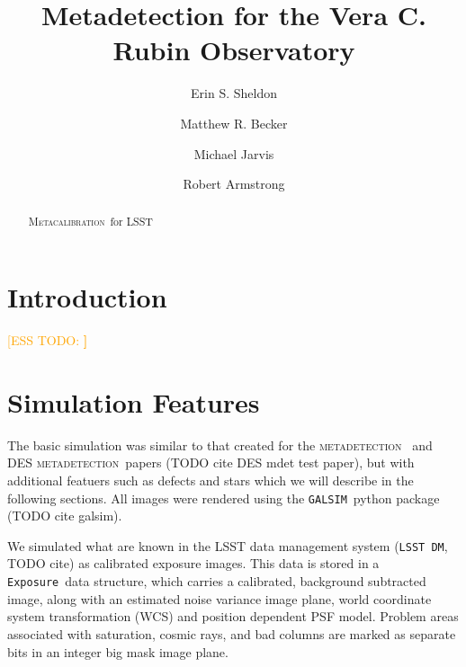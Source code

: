\documentclass[iop, twocolappendix, appendixfloats, numberedappendix, apj]{hackemulateapj}
\newcommand{\esstodo}[1]{\textcolor{orange}{[ESS TODO: \bf #1]}}
\newcommand{\galsim}{\texttt{GALSIM}}
\newcommand{\calexp}{\texttt{Exposure}}
\newcommand{\dm}{\texttt{LSST DM}}
\newcommand{\mdet}{\textsc{metadetection}}
\newcommand{\Mcal}{\textsc{Metacalibration}}
\newcommand{\Mdet}{\textsc{Metadetection}}
\begin{document}



\title{Metadetection for the Vera C. Rubin Observatory}

\author{Erin S. Sheldon}
\author{Matthew R. Becker}
\author{Michael Jarvis}
\author{Robert Armstrong}


\begin{abstract}

    \Mcal\ for LSST

\end{abstract}


\section{Introduction} \label{sec:intro}

\esstodo{}

\section{Simulation Features} \label{sec:sim}

The basic simulation was similar to that created for the \mdet\ \citep{mdet20}
and DES \mdet\ papers (TODO cite DES mdet test paper), but with additional
featuers such as defects and stars which we will describe in the following
sections.  All images were rendered using the \galsim\ python package (TODO
cite galsim).

We simulated what are known in the LSST data management system (\dm, TODO cite)
as calibrated exposure images.  This data is stored in a \calexp\ data
structure, which carries a calibrated, background subtracted image, along with
an estimated noise variance image plane, world coordinate system transformation
(WCS) and position dependent PSF model.  Problem areas associated with
saturation, cosmic rays, and bad columns are marked as separate bits in an
integer big mask image plane.
\end{document}
